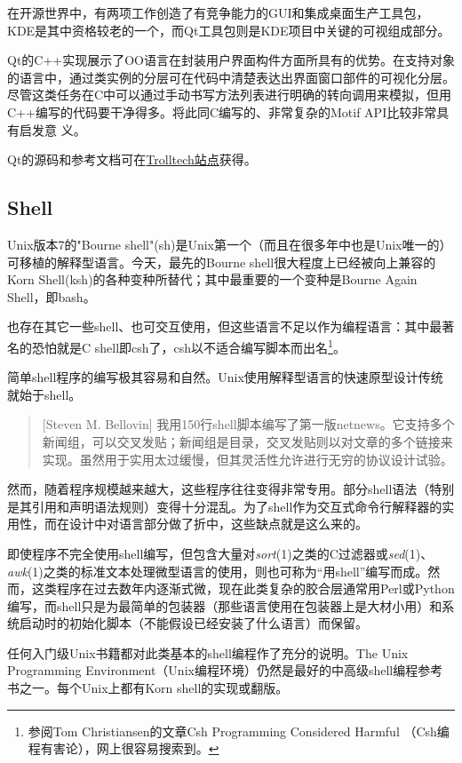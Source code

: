 \documentclass[12pt,oneside]{book}
\begin{document}
\begin{common-format}
在开源世界中，有两项工作创造了有竞争能力的GUI和集成桌面生产工具包，KDE是其中资格较老的一个，而Qt工具包则是KDE项目中关键的可视组成部分。

Qt的C++实现展示了OO语言在封装用户界面构件方面所具有的优势。在支持对象的语言中，通过类实例的分层可在代码中清楚表达出界面窗口部件的可视化分层。尽管这类任务在C中可以通过手动书写方法列表进行明确的转向调用来模拟，但用C++编写的代码要干净得多。将此同C编写的、非常复杂的Motif API比较非常具有启发意
义。

Qt的源码和参考文档可在\href{http://www.trolltech.com/}{Trolltech站点}获得。

\subsection{Shell}
Unix版本7的"Bourne shell"(sh)是Unix第一个（而且在很多年中也是Unix唯一的）可移植的解释型语言。今天，最先的Bourne shell很大程度上已经被向上兼容的Korn Shell(ksh)的各种变种所替代；其中最重要的一个变种是Bourne Again Shell，即bash。

也存在其它一些shell、也可交互使用，但这些语言不足以作为编程语言：其中最著名的恐怕就是C shell即csh了，csh以不适合编写脚本而出名\footnote{参阅Tom Christiansen的文章Csh Programming Considered Harmful （Csh编程有害论），网上很容易搜索到。}。

简单shell程序的编写极其容易和自然。Unix使用解释型语言的快速原型设计传统就始于shell。

\begin{quote}[Steven M. Bellovin]
我用150行shell脚本编写了第一版netnews。它支持多个新闻组，可以交叉发贴；新闻组是目录，交叉发贴则以对文章的多个链接来实现。虽然用于实用太过缓慢，但其灵活性允许进行无穷的协议设计试验。
\end{quote}

然而，随着程序规模越来越大，这些程序往往变得非常专用。部分shell语法（特别是其引用和声明语法规则）变得十分混乱。为了shell作为交互式命令行解释器的实用性，而在设计中对语言部分做了折中，这些缺点就是这么来的。

即使程序不完全使用shell编写，但包含大量对\textit{sort}(1)之类的C过滤器或\textit{sed}(1)、\textit{awk}(1)之类的标准文本处理微型语言的使用，则也可称为“用shell”编写而成。然而，这类程序在过去数年内逐渐式微，现在此类复杂的胶合层通常用Perl或Python编写，而shell只是为最简单的包装器（那些语言使用在包装器上是大材小用）和系统启动时的初始化脚本（不能假设已经安装了什么语言）而保留。

任何入门级Unix书籍都对此类基本的shell编程作了充分的说明。The Unix Programming Environment（Unix编程环境）\cite{Kernighan-Pike84}仍然是最好的中高级shell编程参考书之一。每个Unix上都有Korn shell的实现或翻版。


\end{common-format}
\end{document}
